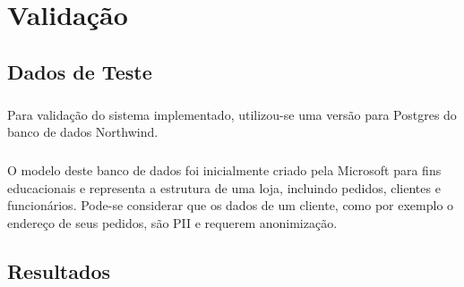 \chapter{Validação}
\label{cap5}

\section{Dados de Teste}

\paragraph{} Para validação do sistema implementado, utilizou-se uma versão para Postgres do banco de dados Northwind\cite{northwindpg}.

\paragraph{} O modelo deste banco de dados foi inicialmente criado pela Microsoft para fins educacionais e representa a estrutura de uma loja, incluindo pedidos, clientes e funcionários. Pode-se considerar que os dados de um cliente, como por exemplo o endereço de seus pedidos, são PII e requerem anonimização.

\section{Resultados}